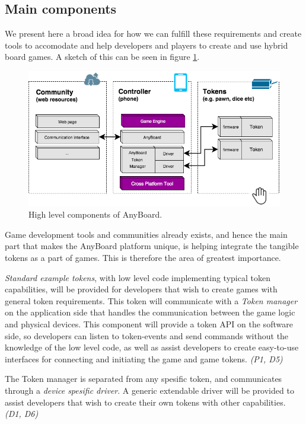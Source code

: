 \subsection{Main components}
We present here a broad idea for how we can fulfill these requirements and create tools to accomodate and help developers and players to create and use hybrid board games. A sketch of this can be seen in figure \ref{fig:high_level_components}.

\begin{figure}[ht]
\includegraphics[width=12cm]{img/broad_architecture_idea.png}
\centering
\caption{High level components of AnyBoard.}
\label{fig:high_level_components}
\end{figure}

Game development tools and communities already exists, and hence the main part that makes the AnyBoard platform unique, is helping integrate the tangible tokens as a part of games. This is therefore the area of greatest importance. 

\emph{Standard example tokens}, with low level code implementing typical token capabilities, will be provided for developers that wish to create games with general token requirements. This token will communicate with a \emph{Token manager} on the application side that handles the communication between the game logic and physical devices. This component will provide a token API on the software side, so developers can listen to token-events and send commands without the knowledge of the low level code, as well as assist developers to create easy-to-use interfaces for connecting and initiating the game and game tokens.  \emph{(P1, D5)}

The Token manager is separated from any spesific token, and communicates through a \emph{device spesific driver}. A generic extendable driver will be provided to assist developers that wish to create their own tokens with other capabilities. \emph{(D1, D6)}

